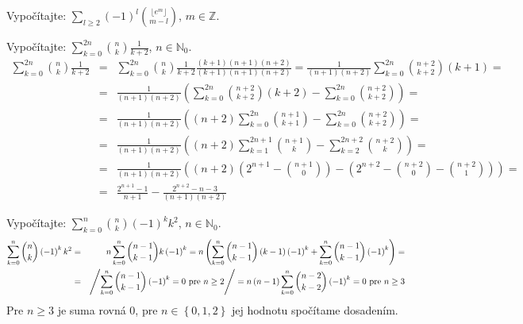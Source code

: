 \pr Vypočítajte: $\sum_{l\geq 2}\left(-1\right)^l{\lfloor e^m \rfloor \choose m-l}$, $m\in\mathbb{Z}$.

\pr Vypočítajte: $\sum_{k=0}^{2n}{n \choose k}\frac1{k+2}$, $n\in\mathbb{N}_0$.
\begin{eqnarray*}
\sum_{k=0}^{2n}{n \choose k}\frac1{k+2} &=& \sum_{k=0}^{2n}{n \choose k}\frac1{k+2} \frac{\left(k+1\right)\left(n+1\right)\left(n+2\right)}{\left(k+1\right)\left(n+1\right)\left(n+2\right)} = \frac1{\left(n+1\right)\left(n+2\right)}\sum_{k=0}^{2n}{n+2 \choose k+2}\left(k+1\right) = \\
&=& \frac1{\left(n+1\right)\left(n+2\right)}\left(\sum_{k=0}^{2n}{n+2 \choose k+2}\left(k+2\right) - \sum_{k=0}^{2n}{n+2 \choose k+2}\right) = \\
&=& \frac1{\left(n+1\right)\left(n+2\right)}\left(\left(n+2\right)\sum_{k=0}^{2n}{n+1 \choose k+1}- \sum_{k=0}^{2n}{n+2 \choose k+2}\right) = \\
&=& \frac1{\left(n+1\right)\left(n+2\right)}\left(\left(n+2\right)\sum_{k=1}^{2n+1}{n+1 \choose k} - \sum_{k=2}^{2n+2}{n+2 \choose k}\right) =\\
&=& \frac1{\left(n+1\right)\left(n+2\right)}\left(\left(n+2\right)\left(2^{n+1}-{n+1 \choose 0}\right) - \left(2^{n+2} - {n+2 \choose 0} - {n+2 \choose 1}\right)\right) =\\
&=& \frac{2^{n+1}-1}{n+1} - \frac{2^{n+2} - n - 3}{\left(n+1\right)\left(n+2\right)}
\end{eqnarray*}

\pr Vypočítajte: $\sum_{k=0}^{n}{n \choose k}\left(-1\right)^k k^2$, $n\in\mathbb{N}_0$.
\begin{eqnarray*}
\sum_{k=0}^{n}{n \choose k}\left(-1\right)^k k^2 &=& n\sum_{k=0}^n {n-1 \choose k-1} k \left(-1\right)^k = n\left(\sum_{k=0}^n {n-1 \choose k-1} \left(k-1\right) \left(-1\right)^k + \sum_{k=0}^n {n-1 \choose k-1} \left(-1\right)^k \right) = \\
&=& \left/ \sum_{k=0}^n {n-1 \choose k-1} \left(-1\right)^k = 0 \hbox{ pre } n\geq2\right/ = n\left(n-1\right)\sum_{k=0}^n{n-2 \choose k-2}\left(-1\right)^k = 0 \hbox{ pre } n\geq3
\end{eqnarray*}
Pre $n\geq3$ je suma rovná $0$, pre $n\in\left\{0,1,2\right\}$ jej hodnotu spočítame dosadením.

